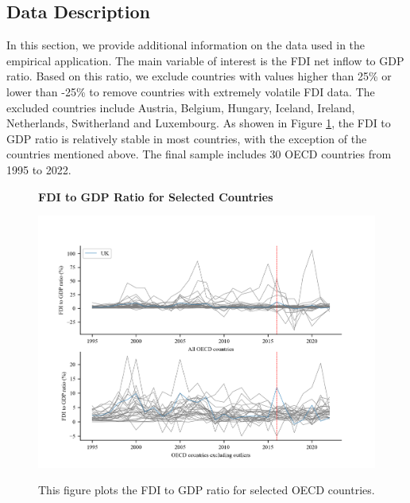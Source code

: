 \documentclass[12pt]{article}
\begin{document}
\subsection{Data Description}
\label{app: data}
In this section, we provide additional information on the data used in the empirical application. The main variable of interest is the FDI net inflow to GDP ratio. Based on this ratio, we exclude countries with values higher than 25\% or lower than -25\% to remove countries with extremely volatile FDI data. The excluded countries include Austria, Belgium, Hungary, Iceland, Ireland, Netherlands, Switherland and Luxembourg. As showen in Figure \ref{app: fdi_oecd}, the FDI to GDP ratio is relatively stable in most countries, with the exception of the countries mentioned above. The final sample includes 30 OECD countries from 1995 to 2022.

\begin{figure}[!ht]
    \centering
    \caption{\textbf{FDI to GDP Ratio for Selected Countries}}
    \includegraphics{figs/fdi_oecd.png}
    \label{app: fdi_oecd}
    \caption*{\footnotesize{This figure plots the FDI to GDP ratio for selected OECD countries.}}
    \end{figure}
\end{document}
